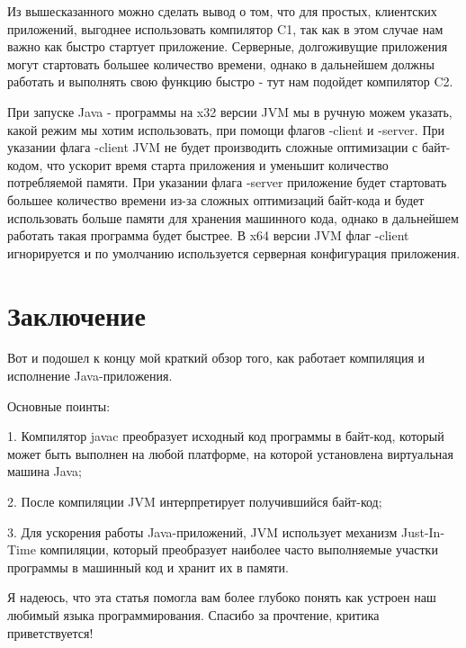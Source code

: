\documentclass[]{scrartcl}
\begin{document}
Из вышесказанного можно сделать вывод о том, что для простых, клиентских приложений, выгоднее использовать компилятор C1, так как в этом случае нам важно как быстро стартует приложение. Серверные, долгоживущие приложения могут стартовать большее количество времени, однако в дальнейшем должны работать и выполнять свою функцию быстро - тут нам подойдет компилятор C2.

При запуске Java - программы на x32 версии JVM мы в ручную можем указать, какой режим мы хотим использовать, при помощи флагов -client и -server. При указании флага -client JVM не будет производить сложные оптимизации с байт-кодом, что ускорит время старта приложения и уменьшит количество потребляемой памяти. При указании флага -server приложение будет стартовать большее количество времени из-за сложных оптимизаций байт-кода и будет использовать больше памяти для хранения машинного кода, однако в дальнейшем работать такая программа будет быстрее. В x64 версии JVM флаг -client игнорируется и по умолчанию используется серверная конфигурация приложения.

\section{Заключение}

Вот и подошел к концу мой краткий обзор того, как работает компиляция и исполнение Java-приложения. 

Основные поинты:

1. Компилятор javac преобразует исходный код программы в байт-код, который может быть выполнен на любой платформе, на которой установлена виртуальная машина Java;

2. После компиляции JVM интерпретирует получившийся байт-код;

3. Для ускорения работы Java-приложений, JVM использует механизм Just-In-Time компиляции, который преобразует наиболее часто выполняемые участки программы в машинный код и хранит их в памяти.

Я надеюсь, что эта статья помогла вам более глубоко понять как устроен наш любимый языка программирования. Спасибо за прочтение, критика приветствуется!
\end{document}
